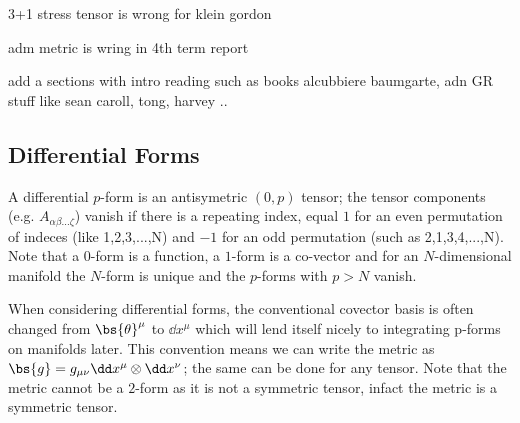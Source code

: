 3+1 stress tensor is wrong for klein gordon

adm metric is wring in 4th term report

add a sections with intro reading such as books alcubbiere baumgarte, adn GR stuff like sean caroll, tong, harvey ..





\subsection{Differential Forms}
A differential $p$-form is an antisymetric $(0,p)$ tensor; the tensor components (e.g. $A_{\alpha\beta...\zeta}$) vanish if there is a repeating index, equal $1$ for an even permutation of indeces (like 1,2,3,...,N) and $-1$ for an odd permutation (such as 2,1,3,4,...,N). Note that a $0$-form is a function, a $1$-form is a co-vector and for an $N$-dimensional manifold the $N$-form is unique and the $p$-forms with $p>N$ vanish. 

When considering differential forms, the conventional covector basis is often changed from $\bs{\theta}^\mu$ to $\dd x^\mu$ which will lend itself nicely to integrating p-forms on manifolds later. This convention means we can write the metric as $\bs{g} = g_{\mu\nu} \dd x^\mu \otimes \dd x^\nu$; the same can be done for any tensor. Note that the metric cannot be a $2$-form as it is not a symmetric tensor, infact the metric is a symmetric tensor.

